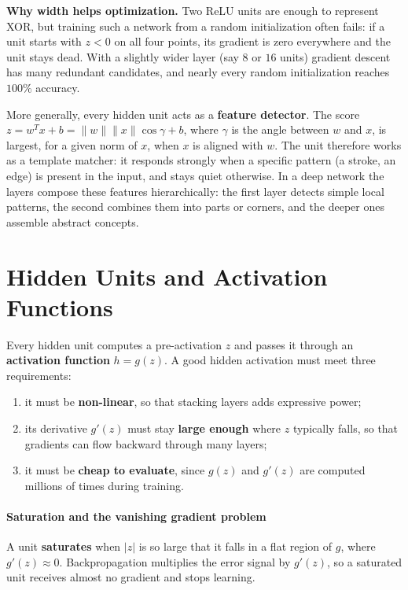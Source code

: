 \begin{note}
    \textbf{Why width helps optimization.} Two ReLU units are enough to represent
    XOR, but training such a network from a random initialization often fails: if a
    unit starts with $z < 0$ on all four points, its gradient is zero everywhere
    and the unit stays dead. With a slightly wider layer (say $8$ or $16$ units)
    gradient descent has many redundant candidates, and nearly every random
    initialization reaches $100\%$ accuracy.
\end{note}

More generally, every hidden unit acts as a \textbf{feature detector}. The score
$z = w^T x + b = \|w\|\|x\|\cos\gamma + b$, where $\gamma$ is the angle between $w$
and $x$, is largest, for a given norm of $x$, when $x$ is aligned with $w$. The
unit therefore works as a template matcher: it responds strongly when a specific
pattern (a stroke, an edge) is present in the input, and stays quiet otherwise. In
a deep network the layers compose these features hierarchically: the first layer
detects simple local patterns, the second combines them into parts or corners, and
the deeper ones assemble abstract concepts.

\section{Hidden Units and Activation Functions}
\label{sec:hidden}
Every hidden unit computes a pre-activation $z$ and passes it through an
\textbf{activation function} $h = g(z)$. A good hidden activation must meet three
requirements:
\begin{enumerate}
    \item it must be \textbf{non-linear}, so that stacking layers adds expressive
          power;
    \item its derivative $g'(z)$ must stay \textbf{large enough} where $z$
          typically falls, so that gradients can flow backward through many layers;
    \item it must be \textbf{cheap to evaluate}, since $g(z)$ and $g'(z)$ are
          computed millions of times during training.
\end{enumerate}

\paragraph{Saturation and the vanishing gradient problem}
A unit \textbf{saturates} when $|z|$ is so large that it falls in a flat region of
$g$, where $g'(z) \approx 0$. Backpropagation multiplies the error signal by
$g'(z)$, so a saturated unit receives almost no gradient and stops learning.

